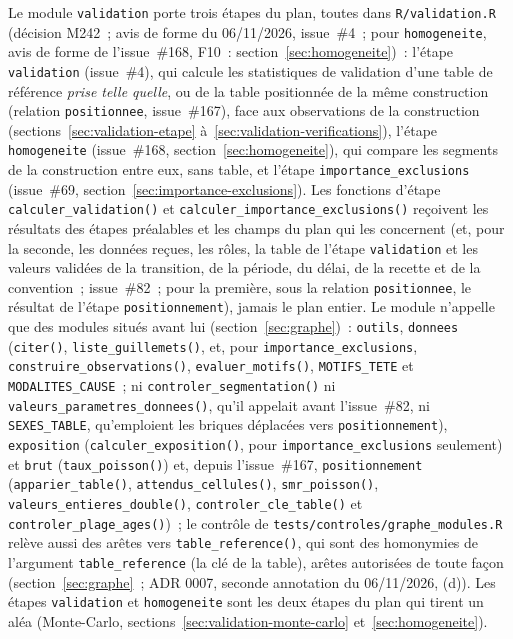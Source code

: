 \documentclass[a4paper,11pt]{article}
\newcommand{\code}[1]{\texttt{\small #1}}
\begin{document}
{\sloppy Le module \code{validation} porte trois étapes du plan, toutes dans
\code{R/validation.R} (décision M242~; avis de forme du 06/11/2026,
issue~\#4~; pour \code{homogeneite}, avis de forme de l'issue~\#168,
F10~: section~\ref{sec:homogeneite})~: l'étape \code{validation} (issue~\#4), qui calcule les
statistiques de validation d'une table de référence \emph{prise telle
quelle}, ou de la table positionnée de la même construction (relation
\code{positionnee}, issue~\#167), face aux observations de la construction
(sections~\ref{sec:validation-etape} à~\ref{sec:validation-verifications}),
l'étape \code{homogeneite} (issue~\#168, section~\ref{sec:homogeneite}),
qui compare les segments de la construction entre eux, sans table,
et l'étape \code{importance\_exclusions} (issue~\#69,
section~\ref{sec:importance-exclusions}). Les fonctions d'étape
\code{calculer\_validation()} et \code{calculer\_importance\_exclusions()}
reçoivent les résultats des étapes préalables et les champs du plan qui les
concernent (et, pour la seconde, les données reçues, les rôles, la table
de l'étape \code{validation} et les valeurs validées de la transition, de
la période, du délai, de la recette et de la convention~; issue~\#82~;
pour la première, sous la relation \code{positionnee}, le résultat de
l'étape \code{positionnement}), jamais le plan entier. Le module n'appelle que des modules
situés avant lui (section~\ref{sec:graphe})~: \code{outils}, \code{donnees}
(\code{citer()}, \code{liste\_guillemets()}, et, pour
\code{importance\_exclusions}, \code{construire\_observations()},
\code{evaluer\_motifs()}, \code{MOTIFS\_TETE} et \code{MODALITES\_CAUSE}~; ni
\code{controler\_segmentation()} ni \code{valeurs\_parametres\_donnees()},
qu'il appelait avant l'issue~\#82, ni \code{SEXES\_TABLE}, qu'emploient
les briques déplacées vers \code{positionnement}),
\code{exposition} (\code{calculer\_exposition()}, pour
\code{importance\_exclusions} seulement) et
\code{brut} (\code{taux\_poisson()}) et, depuis l'issue~\#167,
\code{positionnement} (\code{apparier\_table()}, \code{attendus\_cellules()},
\code{smr\_poisson()}, \code{valeurs\_entieres\_double()},
\code{controler\_cle\_table()} et \code{controler\_plage\_ages()})~; le contrôle de
\code{tests/controles/graphe\_modules.R} relève aussi des arêtes vers
\code{table\_reference()}, qui sont des homonymies de l'argument
\code{table\_reference} (la clé de la table), arêtes autorisées de toute
façon (section~\ref{sec:graphe}~; ADR 0007, seconde
annotation du 06/11/2026, (d)). Les étapes \code{validation} et
\code{homogeneite} sont les deux étapes du plan qui tirent un aléa
(Monte-Carlo, sections~\ref{sec:validation-monte-carlo} et~\ref{sec:homogeneite}).\par}
\end{document}
